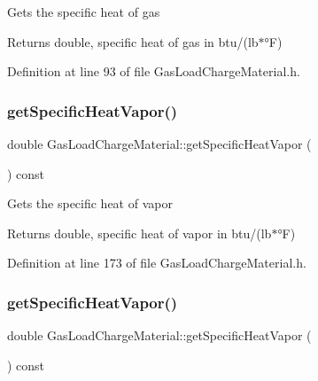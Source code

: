 Gets the specific heat of gas

\begin{DoxyReturn}{Returns}
double, specific heat of gas in btu/(lb$\ast$°F) 
\end{DoxyReturn}


Definition at line 93 of file Gas\+Load\+Charge\+Material.\+h.

\mbox{\label{class_gas_load_charge_material_a9a07e86938bb831e51ac3f53f696a3c3}} 
\subsubsection{\texorpdfstring{get\+Specific\+Heat\+Vapor()}{getSpecificHeatVapor()}\hspace{0.1cm}{\footnotesize\ttfamily [1/3]}}
{\footnotesize\ttfamily double Gas\+Load\+Charge\+Material\+::get\+Specific\+Heat\+Vapor (\begin{DoxyParamCaption}{ }\end{DoxyParamCaption}) const\hspace{0.3cm}{\ttfamily [inline]}}

Gets the specific heat of vapor

\begin{DoxyReturn}{Returns}
double, specific heat of vapor in btu/(lb$\ast$°F) 
\end{DoxyReturn}


Definition at line 173 of file Gas\+Load\+Charge\+Material.\+h.

\mbox{\label{class_gas_load_charge_material_a9a07e86938bb831e51ac3f53f696a3c3}} 
\subsubsection{\texorpdfstring{get\+Specific\+Heat\+Vapor()}{getSpecificHeatVapor()}\hspace{0.1cm}{\footnotesize\ttfamily [2/3]}}
{\footnotesize\ttfamily double Gas\+Load\+Charge\+Material\+::get\+Specific\+Heat\+Vapor (\begin{DoxyParamCaption}{ }\end{DoxyParamCaption}) const\hspace{0.3cm}{\ttfamily [inline]}}

